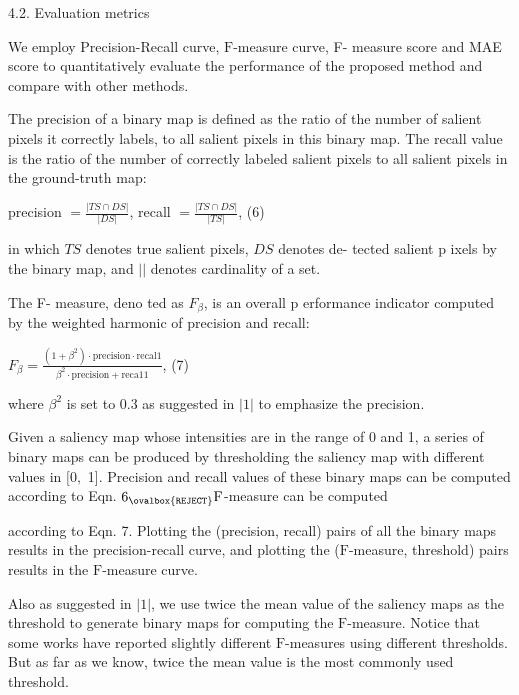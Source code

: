 \documentclass[a4paper,10pt]{article}
\begin{document}
4.2. Evaluation metrics

We employ Precision-Recall curve, $\mathrm{F}$-measure curve, F- measure score and MAE score to quantitatively evaluate the performance of the proposed method and compare with other methods.

The precision of a binary map is defined as the ratio of the number of salient pixels it correctly labels, to all salient pixels in this binary map. The recall value is the ratio of the number of correctly labeled salient pixels to all salient pixels in the ground-truth map:

precision $=\displaystyle \frac{|TS\cap DS|}{|DS|}$, recall $=\displaystyle \frac{|TS\cap DS|}{|TS|}$, (6)

in which $TS$ denotes true salient pixels, $DS$ denotes de- tected salient $\mathrm{p}$ ixels by the binary map, and $| |$ denotes cardinality of a set.

The F- measure, $\mathrm{d}$eno ted as $F_{\beta}$, is an overall $\mathrm{p}$ erformance indicator computed by the weighted harmonic of precision and recall:
\begin{center}
$F_{\beta}=\displaystyle \frac{(1+\beta^{2})\cdot \mathrm{p}\mathrm{r}\mathrm{e}\mathrm{c}\mathrm{i}\mathrm{s}\mathrm{i}\mathrm{o}\mathrm{n}\cdot \mathrm{r}\mathrm{e}\mathrm{c}\mathrm{a}\mathrm{l}1}{\beta^{2}\cdot \mathrm{p}\mathrm{r}\mathrm{e}\mathrm{c}\mathrm{i}\mathrm{s}\mathrm{i}\mathrm{o}\mathrm{n}+\mathrm{r}\mathrm{e}\mathrm{c}\mathrm{a}11}$,   (7)
\end{center}
where $\beta^{2}$ is set to 0.3 as suggested in $|1|$ to emphasize the precision.

Given a saliency map whose intensities are in the range of $0$ and 1, a series of binary maps can be produced by thresholding the saliency map with different values in $[0,$ 1]. Precision and recall values of these binary maps can be computed according to Eqn. $6_{\ovalbox{\tt\small REJECT}} \mathrm{F}$-measure can be computed

according to Eqn. 7. Plotting the (precision, recall) pairs of all the binary maps results in the precision-recall curve, and plotting the ($\mathrm{F}$-measure, threshold) pairs results in the $\mathrm{F}$-measure curve.

Also as suggested in $|1|$, we use twice the mean value of the saliency maps as the threshold to generate binary maps for computing the $\mathrm{F}$-measure. Notice that some works have reported slightly different $\mathrm{F}$-measures using different thresholds. But as far as we know, twice the mean value is the most commonly used threshold.
\end{document}
